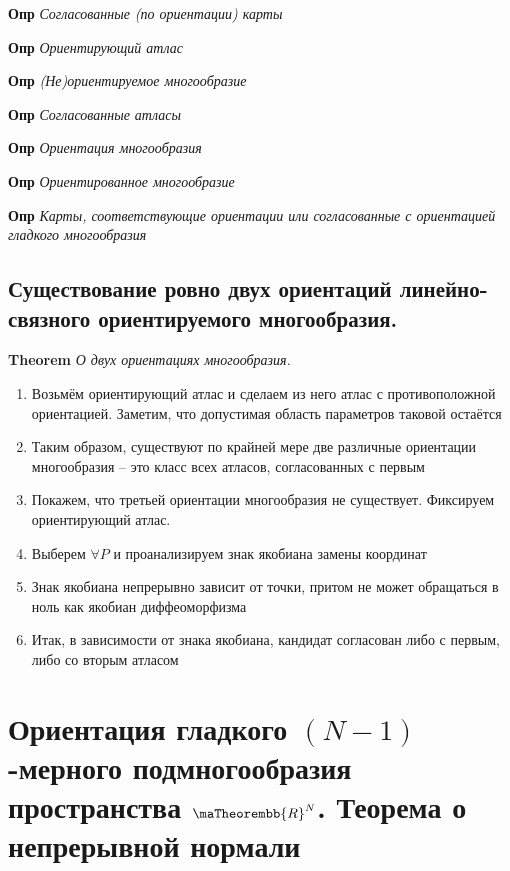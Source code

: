 \documentclass[a4paper, 14pt]{article}
\begin{document}
    \textbf{Опр} \textit{Согласованные (по ориентации) карты}
    
    \textbf{Опр} \textit{Ориентирующий атлас}
    
    \textbf{Опр} \textit{(Не)ориентируемое многообразие}
    
    \textbf{Опр} \textit{Согласованные атласы}
    
    \textbf{Опр} \textit{Ориентация многообразия}
    
    \textbf{Опр} \textit{Ориентированное многообразие}
    
    \textbf{Опр} \textit{Карты, соответствующие ориентации или согласованные с ориентацией гладкого многообразия}
    
    \subsection{Существование ровно двух ориентаций линейно-связного ориентируемого многообразия.}
    
    \textbf{Theorem} \textit{О двух ориентациях многообразия.}
    
    \begin{enumerate}
        \item Возьмём ориентирующий атлас и сделаем из него атлас с противоположной ориентацией.
        Заметим, что допустимая область параметров таковой остаётся
        \item Таким образом, существуют по крайней мере две различные ориентации многообразия -- это класс всех
        атласов, согласованных с первым
        \item Покажем, что третьей ориентации многообразия не существует.
        Фиксируем ориентирующий атлас.
        \item Выберем $\forall P$ и проанализируем знак якобиана замены координат
        \item Знак якобиана непрерывно зависит от точки, притом не может обращаться в ноль как якобиан диффеоморфизма
        \item Итак, в зависимости от знака якобиана, кандидат согласован либо с первым, либо со вторым атласом
    \end{enumerate}
    
    \section{Ориентация гладкого $(N - 1)$-мерного подмногообразия пространства $\maTheorembb{R}^N$.
    Теорема о непрерывной нормали}
    
\end{document}

